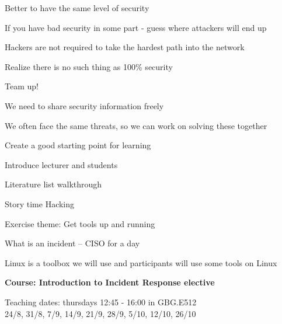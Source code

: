 \documentclass[Screen16to9,17pt]{foils}
\begin{document}


\begin{list1}
\item Better to have the same level of security
\item If you have bad security in some part - guess where attackers will end up
\item Hackers are not required to take the hardest path into the network
\item Realize there is no such thing as 100\% security
\end{list1}





\begin{list1}
\item Team up!
\item We need to share security information freely
\item We often face the same threats, so we can work on solving these together
\end{list1}



\begin{list2}
\item Create a good starting point for learning
\item Introduce lecturer and students
\item Literature list walkthrough
\item Story time Hacking
\end{list2}

Exercise theme: Get tools up and running
\begin{list2}
\item What is an incident -- CISO for a day
\end{list2}

Linux is a toolbox we will use and participants will use some tools on Linux




{\Large\bf Course: Introduction to Incident Response elective}

Teaching dates: thursdays 12:45 - 16:00 in GBG.E512\\
24/8, 31/8, 7/9, 14/9, 21/9, 28/9, 5/10, 12/10, 26/10
\end{document}
